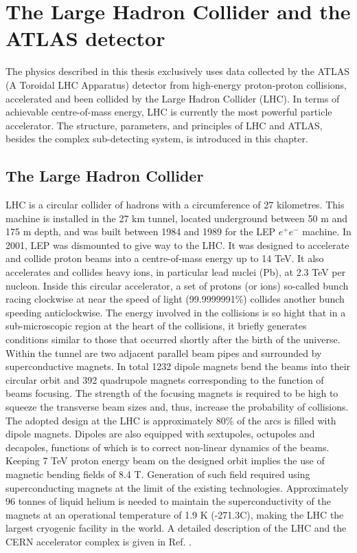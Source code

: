 \newpage
\chapter{The Large Hadron Collider and the ATLAS detector}
\label{LHC&ATLAS}

The physics described in this thesis exclusively uses data collected by the ATLAS (A Toroidal LHC Apparatus) detector from high-energy proton-proton collisions, accelerated and been collided by the Large Hadron Collider (LHC). In terms of achievable centre-of-mass energy, LHC is currently the most powerful particle accelerator. The structure, parameters, and principles of LHC and ATLAS, besides the complex sub-detecting system, is introduced in this chapter.

\section{The Large Hadron Collider}
\label{chap2:LHC}
LHC is a circular collider of hadrons with a circumference of 27 kilometres. This machine is installed in the 27 km tunnel, located underground between 50 m and 175 m depth, and was built between 1984 and 1989 for the LEP $e^+e^-$ machine. In 2001, LEP was dismounted to give way to the LHC. It was designed to accelerate and collide proton beams into a centre-of-mass energy up to 14 TeV. It also accelerates and collides heavy ions, in particular lead nuclei (Pb), at 2.3 TeV per nucleon. Inside this circular accelerator, a set of protons (or ions) so-called bunch racing clockwise at near the speed of light (99.9999991\%) collides another bunch speeding anticlockwise. The energy involved in the collisions is so hight that in a sub-microscopic region at the heart of the collisions, it briefly generates conditions similar to those that occurred shortly after the birth of the universe. \\ 
Within the tunnel are two adjacent parallel beam pipes and surrounded by superconductive magnets. In total 1232 dipole magnets bend the beams into their circular orbit and 392 quadrupole magnets corresponding to the function of beams focusing. The strength of the focusing magnets is required to be high to squeeze the transverse beam sizes and, thus, increase the probability of collisions. The adopted design at the LHC is approximately 80\% of the arcs is filled with dipole magnets. Dipoles are also equipped with sextupoles, octupoles and decapoles, functions of which is to correct non-linear dynamics of the beams.  Keeping 7 TeV proton energy beam on the designed orbit implies the use of magnetic bending fields of 8.4 T. Generation of such field required using superconducting magnets at the limit of the existing technologies. Approximately 96 tonnes of liquid helium is needed to maintain the superconductivity of the magnets at an operational temperature of 1.9 K (-271.3C), making the LHC the largest cryogenic facility in the world.  A detailed description of the LHC and the CERN accelerator complex is given in Ref. \cite{LHCTDR}.

